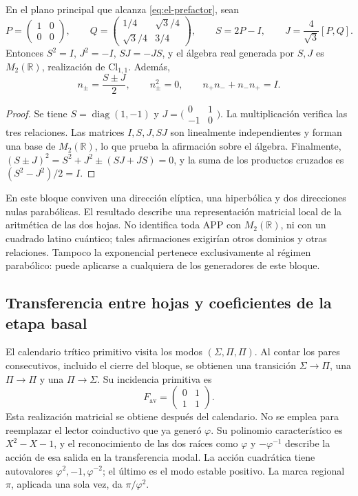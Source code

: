 \begin{proposition}
En el plano principal que alcanza \eqref{eq:el-prefactor}, sean
\[
 P=\begin{pmatrix}1&0\\0&0\end{pmatrix},\qquad
 Q=\begin{pmatrix}1/4&\sqrt3/4\\\sqrt3/4&3/4\end{pmatrix},\qquad
 S=2P-I,\qquad J=\frac4{\sqrt3}[P,Q].
\]
Entonces \(S^2=I\), \(J^2=-I\), \(SJ=-JS\), y el álgebra real
generada por \(S,J\) es \(M_2(\mathbb R)\), realización de
\(\mathrm{Cl}_{1,1}\). Además,
\[
 n_\pm=\frac{S\pm J}{2},\qquad
 n_\pm^2=0,\qquad n_+n_-+n_-n_+=I.
\]
\end{proposition}
\begin{proof}
Se tiene \(S=\operatorname{diag}(1,-1)\) y
\(J=\bigl(\begin{smallmatrix}0&1\\-1&0\end{smallmatrix}\bigr)\).
La multiplicación verifica las tres relaciones. Las matrices
\(I,S,J,SJ\) son linealmente independientes y forman una base de
\(M_2(\mathbb R)\), lo que prueba la afirmación sobre el álgebra.
Finalmente, \((S\pm J)^2=S^2+J^2\pm(SJ+JS)=0\), y la suma de los
productos cruzados es \((S^2-J^2)/2=I\).
\end{proof}

En este bloque conviven una dirección elíptica, una hiperbólica y dos
direcciones nulas parabólicas. El resultado describe una representación
matricial local de la aritmética de las dos hojas. No identifica toda APP
con \(M_2(\mathbb R)\), ni con un cuadrado latino cuántico; tales
afirmaciones exigirían otros dominios y otras relaciones. Tampoco la
exponencial pertenece exclusivamente al régimen parabólico: puede
aplicarse a cualquiera de los generadores de este bloque.

\subsection{Transferencia entre hojas y coeficientes de la etapa basal}

El calendario trítico primitivo visita los modos
\((\Sigma,\Pi,\Pi)\). Al contar los pares consecutivos, incluido el
cierre del bloque, se obtienen una transición \(\Sigma\to\Pi\), una
\(\Pi\to\Pi\) y una \(\Pi\to\Sigma\). Su incidencia primitiva es
\[
 F_{\mathrm{av}}=\begin{pmatrix}0&1\\1&1\end{pmatrix}.
\]
Esta realización matricial se obtiene después del calendario. No se
emplea para reemplazar el lector coinductivo que ya generó \(\varphi\).
Su polinomio característico es \(X^2-X-1\), y el reconocimiento de las
dos raíces como \(\varphi\) y \(-\varphi^{-1}\) describe la acción de
esa salida en la transferencia modal. La acción cuadrática tiene autovalores
\(\varphi^2,-1,\varphi^{-2}\); el último es el modo estable positivo.
La marca regional \(\pi\), aplicada una sola vez, da
\(\pi/\varphi^2\).


